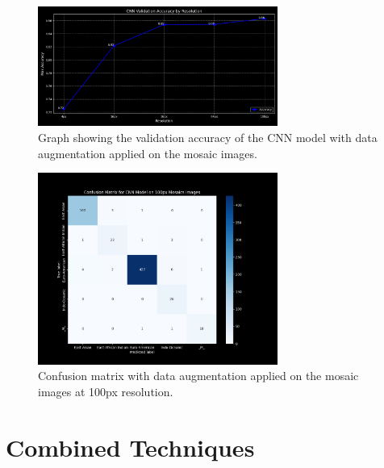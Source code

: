 \begin{appendices}
	\begin{figure}[H]
		\centering
		\includegraphics[width=0.7\textwidth]{../imgs/graphs/kfold/cnn_validation_accuracy_kfold_mosaics_line_mask_5_aug.png}
		\caption{Graph showing the validation accuracy of the CNN model with data augmentation applied on the mosaic images.}
		\label{fig:augmentation_accuracy_mosaic}
	\end{figure}

	\begin{figure}[H]
		\centering
		\includegraphics[width=0.7\textwidth]{../imgs/graphs/kfold/cnn_confusion_matrix_kfold_mosaics_100px_mask_5_aug.png}
		\caption{Confusion matrix with data augmentation applied on the mosaic images at 100px resolution.}
		\label{fig:augmentation_confusion_matrix_mosaic}
	\end{figure}

	\section{Combined Techniques}
	\label{app:combined_techniques}


\end{appendices}
